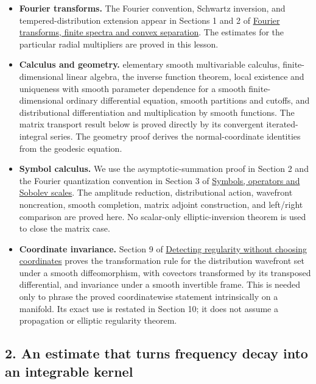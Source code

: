 \documentclass[
  11pt,
]{article}
\providecommand{\tightlist}{%
  \setlength{\itemsep}{0pt}\setlength{\parskip}{0pt}}
\begin{document}
\begin{itemize}
\tightlist
\item
  \textbf{Fourier transforms.} The Fourier convention, Schwartz
  inversion, and tempered-distribution extension appear in Sections 1
  and 2 of \href{prerequisite-bridges.pdf}{Fourier transforms, finite
  spectra and convex separation}. The estimates for the particular
  radial multipliers are proved in this lesson.
\item
  \textbf{Calculus and geometry.} elementary smooth multivariable
  calculus, finite-dimensional linear algebra, the inverse function
  theorem, local existence and uniqueness with smooth parameter
  dependence for a smooth finite-dimensional ordinary differential
  equation, smooth partitions and cutoffs, and distributional
  differentiation and multiplication by smooth functions. The matrix
  transport result below is proved directly by its convergent
  iterated-integral series. The geometry proof derives the
  normal-coordinate identities from the geodesic equation.
\item
  \textbf{Symbol calculus.} We use the asymptotic-summation proof in
  Section 2 and the Fourier quantization convention in Section 3 of
  \href{euclidean-symbol-calculus.pdf}{Symbols, operators and Sobolev
  scales}. The amplitude reduction, distributional action, wavefront
  noncreation, smooth completion, matrix adjoint construction, and
  left/right comparison are proved here. No scalar-only
  elliptic-inversion theorem is used to close the matrix case.
\item
  \textbf{Coordinate invariance.} Section 9 of
  \href{geometric-microlocal-calculus.pdf}{Detecting regularity without
  choosing coordinates} proves the transformation rule for the
  distribution wavefront set under a smooth diffeomorphism, with
  covectors transformed by its transposed differential, and invariance
  under a smooth invertible frame. This is needed only to phrase the
  proved coordinatewise statement intrinsically on a manifold. Its exact
  use is restated in Section 10; it does not assume a propagation or
  elliptic regularity theorem.
\end{itemize}

\subsection{2. An estimate that turns frequency decay into an integrable
kernel}\label{an-estimate-that-turns-frequency-decay-into-an-integrable-kernel}
\end{document}
